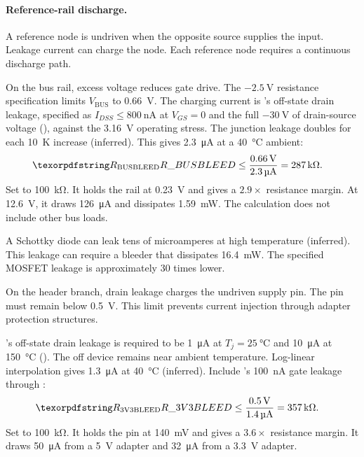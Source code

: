 \paragraph{Reference-rail discharge.} A reference node is undriven when the
opposite source supplies the input. Leakage current can charge the node. Each
reference node requires a continuous discharge path.

On the bus rail, excess voltage reduces  gate drive. The
$-\SI{2.5}{\volt}$ resistance specification limits $V_{\mathrm{BUS}}$ to
\SI{0.66}{\volt}. The charging current is
's off-state drain leakage, specified as
$I_{DSS}\leq\SI{800}{\nano\ampere}$ at $V_{GS}=0$ and the full
$-\SI{30}{\volt}$ of drain-source voltage (), against the
\SI{3.16}{\volt} operating stress. The junction leakage doubles for each
\SI{10}{\kelvin} increase (inferred). This gives \SI{2.3}{\micro\ampere} at a
\SI{40}{\celsius} ambient:
\begin{align*}
  \des{R}{BUSBLEED} &\leq \frac{\SI{0.66}{\volt}}{\SI{2.3}{\micro\ampere}}
    = \SI{287}{\kilo\ohm}.
\end{align*}
Set  to \SI{100}{\kilo\ohm}. It holds the rail at
\SI{0.23}{\volt} and gives a $2.9\times$ resistance margin. At
\SI{12.6}{\volt}, it draws \SI{126}{\micro\ampere} and dissipates
\SI{1.59}{\milli\watt}. The calculation does not include other bus loads.

A Schottky diode can leak tens of microamperes at high temperature (inferred).
This leakage can require a bleeder that dissipates \SI{16.4}{\milli\watt}.
The specified MOSFET leakage is approximately 30 times lower.

On the header branch,  drain leakage charges the undriven supply
pin. The pin must remain below \SI{0.5}{\volt}. This limit prevents current
injection through adapter protection structures.

's off-state drain leakage is required to be
\SI{1}{\micro\ampere} at $T_j = \SI{25}{\celsius}$ and \SI{10}{\micro\ampere} at
\SI{150}{\celsius} (). The off device remains near ambient
temperature. Log-linear interpolation gives \SI{1.3}{\micro\ampere} at
\SI{40}{\celsius} (inferred). Include 's
\SI{100}{\nano\ampere} gate leakage through :
\begin{align*}
  \des{R}{3V3BLEED} &\leq \frac{\SI{0.5}{\volt}}{\SI{1.4}{\micro\ampere}}
    = \SI{357}{\kilo\ohm}.
\end{align*}
Set  to \SI{100}{\kilo\ohm}. It holds the pin at
\SI{140}{\milli\volt} and gives a $3.6\times$ resistance margin. It draws
\SI{50}{\micro\ampere} from a \SI{5}{\volt} adapter and
\SI{32}{\micro\ampere} from a \SI{3.3}{\volt} adapter.

